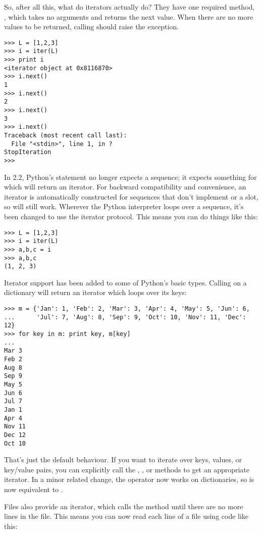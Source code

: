 \documentclass{howto}
\begin{document}
So, after all this, what do iterators actually do?  They have one
required method, , which takes no arguments and returns
the next value.  When there are no more values to be returned, calling
 should raise the  exception.

\begin{verbatim}
>>> L = [1,2,3]
>>> i = iter(L)
>>> print i
<iterator object at 0x8116870>
>>> i.next()
1
>>> i.next()
2
>>> i.next()
3
>>> i.next()
Traceback (most recent call last):
  File "<stdin>", line 1, in ?
StopIteration
>>>      
\end{verbatim}

In 2.2, Python's  statement no longer expects a sequence;
it expects something for which  will return an iterator.
For backward compatibility and convenience, an iterator is
automatically constructed for sequences that don't implement
 or a  slot, so  will still work.  Wherever the Python interpreter loops over
a sequence, it's been changed to use the iterator protocol.  This
means you can do things like this:

\begin{verbatim}
>>> L = [1,2,3]
>>> i = iter(L)
>>> a,b,c = i
>>> a,b,c
(1, 2, 3)
\end{verbatim}

Iterator support has been added to some of Python's basic types.  
Calling  on a dictionary will return an iterator
which loops over its keys:

\begin{verbatim}
>>> m = {'Jan': 1, 'Feb': 2, 'Mar': 3, 'Apr': 4, 'May': 5, 'Jun': 6,
...      'Jul': 7, 'Aug': 8, 'Sep': 9, 'Oct': 10, 'Nov': 11, 'Dec': 12}
>>> for key in m: print key, m[key]
...
Mar 3
Feb 2
Aug 8
Sep 9
May 5
Jun 6
Jul 7
Jan 1
Apr 4
Nov 11
Dec 12
Oct 10
\end{verbatim}          

That's just the default behaviour.  If you want to iterate over keys,
values, or key/value pairs, you can explicitly call the
, , or 
methods to get an appropriate iterator.  In a minor related change,
the  operator now works on dictionaries, so
 is now equivalent to
.

Files also provide an iterator, which calls the 
method until there are no more lines in the file.  This means you can
now read each line of a file using code like this:
\end{document}
